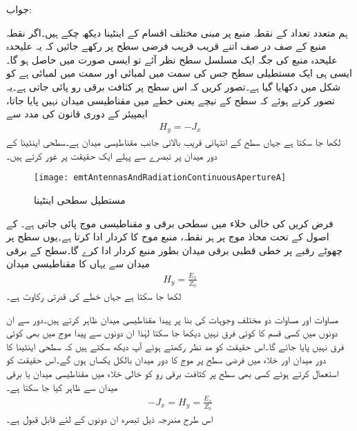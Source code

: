 جواب:

ہم متعدد تعداد کے نقطہ منبع پر مبنی مختلف اقسام کے اینٹینا دیکھ چکے ہیں۔اگر نقطہ منبع کے صف در صف اتنے قریب قریب فرضی سطح پر رکھے جائیں کہ یہ علیحدہ علیحدہ منبع کی جگہ ایک مسلسل سطح نظر آئے تو ایسی صورت میں  حاصل ہو گا۔ایسی ہی ایک مستطیلی سطح جس کی  سمت میں لمبائی  اور  سمت میں لمبائی  ہے کو شکل  میں دکھایا گیا ہے۔تصور کریں کہ اس سطح پر  کثافت برقی رو پائی جاتی ہے۔یہ تصور کرتے ہوئے کہ سطح کے نیچے یعنی  خطے میں مقناطیسی میدان نہیں پایا جاتا، ایمپیئر کے دوری قانون کی مدد سے 
\begin{align}\label{مساوات_اینٹینا_فرضی_کثافت_رو}
H_y=-J_x
\end{align}
لکھا جا سکتا ہے جہاں  سطح کے انتہائی قریب بالائی جانب مقناطیسی میدان ہے۔سطحی اینٹینا کے دور میدان پر تبصرے سے پہلے ایک حقیقت پر غور کرتے ہیں۔

\begin{figure}
\centering
\texttt{[image: emtAntennasAndRadiationContinuousApertureA]}
\caption{مستطیل سطحی اینٹینا}
\label{شکل_اینٹینا_مستطیل_سطحی}
\end{figure}

فرض کریں کی خالی خلاء میں سطحی برقی و مقناطیسی موج پائی جاتی ہے۔ کے اصول کے تحت محاذ موج پر ہر نقطہ، منبع موج کا کردار ادا کرتا ہے۔یوں سطح پر چھوٹے رقبے   پر خطی قطبی برقی میدان  بطور منبع کردار ادا کرے گا۔سطح کے برقی میدان  سے یہاں کا مقناطیسی میدان
\begin{align}\label{مساوات_اینٹینا_فرضی_مقناطیسی_میدان}
H_y=\frac{E_x}{Z_0}
\end{align}
لکھا جا سکتا ہے جہاں  خطے کی قدرتی رکاوٹ  ہے۔

مساوات  اور مساوات  دو مختلف وجوہات کی بنا پر پیدا مقناطیسی میدان ظاہر کرتے ہیں۔دور سے ان دونوں میں کسی قسم کا کوئی فرق نہیں دیکھا جا سکتا لہٰذا ان دونوں سے پیدا موج میں بھی کوئی فرق نہیں پایا جائے گا۔اس حقیقت کو مد نظر رکھتے ہوئے  آپ دیکھ سکتے ہیں کہ سطحی اینٹینا کا دور میدان اور  خلاء میں فرضی سطح پر موج کا دور میدان بالکل یکساں ہوں گے۔اس حقیقت کو استعمال کرتے ہوئے کسی بھی سطح پر کثافت برقی رو  کو خالی خلاء میں مقناطیسی میدان  یا برقی میدان  سے ظاہر کیا جا سکتا ہے۔
\begin{align}\label{مساوات_اینٹینا_حقیقی_اور_فرضی}
-J_x=H_y=\frac{E_x}{Z_0}
\end{align}
اس طرح مندرجہ ذیل تبصرہ ان دونوں کے لئے قابل قبول ہے۔

